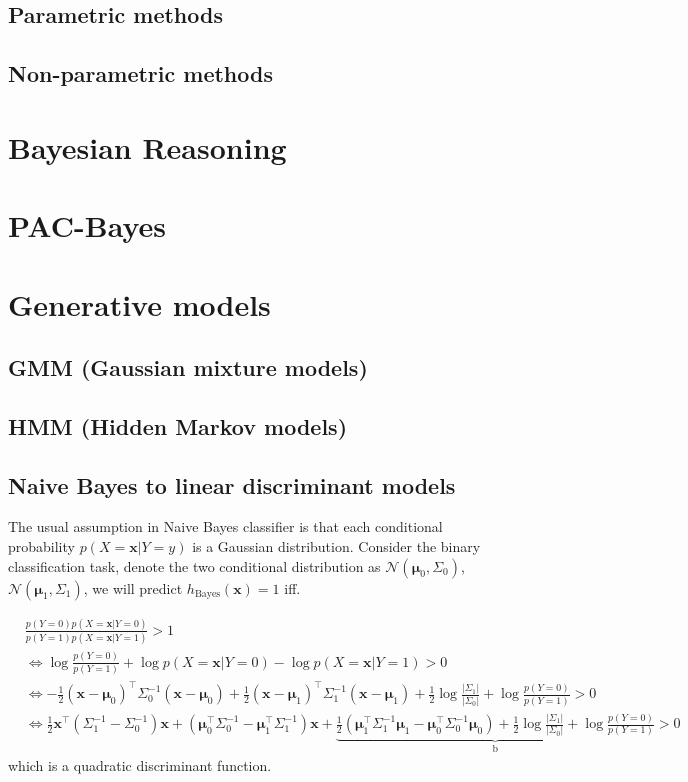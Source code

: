 \documentclass{article}
\begin{document}
	\subsection{Parametric methods}
	\subsection{Non-parametric methods}

\section{Bayesian Reasoning}

\section{PAC-Bayes}

\section{Generative models}
	\subsection{GMM (Gaussian mixture models)}
	\subsection{HMM (Hidden Markov models)}
	
	\subsection{Naive Bayes to linear discriminant models}
	The usual assumption in Naive Bayes classifier is that each conditional probability $p(X=\mathbf{x}|Y=y)$ is a Gaussian distribution. Consider the binary classification task, denote the two conditional distribution as $\mathcal{N}(\mathbf{\mu}_0,\Sigma_0)$, $\mathcal{N}(\mathbf{\mu}_1,\Sigma_1)$, we will predict $h_{\mathrm{Bayes}}(\mathbf{x})=1$ iff.
	
	\begin{equation*}
	\begin{split}
	&\frac{p(Y=0) p(X=\mathbf{x}|Y=0)}{p(Y=1) p(X=\mathbf{x}|Y=1)} > 1 \\
	&\iff \log \frac{p(Y=0)}{p(Y=1)} + \log p(X=\mathbf{x}|Y=0) - \log p(X=\mathbf{x}|Y=1) > 0 \\
	&\iff -\frac{1}{2}(\mathbf{x}-\mathbf{\mu}_0)^\top \Sigma_0^{-1}(\mathbf{x}-\mathbf{\mu}_0) + \frac{1}{2}(\mathbf{x}-\mathbf{\mu}_1)^\top \Sigma_1^{-1}(\mathbf{x}-\mathbf{\mu}_1) +  \frac{1}{2}\log\frac{|\Sigma_1|}{|\Sigma_0|} + \log \frac{p(Y=0)}{p(Y=1)} > 0 \\
	&\iff \frac{1}{2} \mathbf{x}^\top ( \Sigma_1^{-1} - \Sigma_0^{-1}) \mathbf{x} + (\mathbf{\mu}_0^\top\Sigma_0^{-1} - \mathbf{\mu}_1^\top\Sigma_1^{-1}) \mathbf{x} + \underbrace{\frac{1}{2} (\mathbf{\mu}_1^\top\Sigma_1^{-1}\mathbf{\mu}_1 - \mathbf{\mu}_0^\top\Sigma_0^{-1}\mathbf{\mu}_0 ) + \frac{1}{2}\log\frac{|\Sigma_1|}{|\Sigma_0|} + \log \frac{p(Y=0)}{p(Y=1)}}_{\mathrm{b}} > 0
	\end{split}
	\end{equation*}
which is a quadratic discriminant function.
\end{document}
